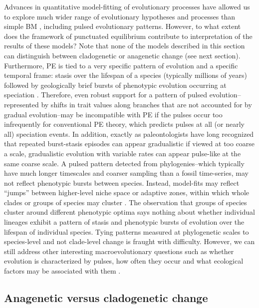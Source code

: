 Advances in quantitative model-fitting of evolutionary processes have allowed us to explore much wider range of evolutionary hypotheses and processes than simple BM \citep{PennellHarmon}, including pulsed evolutionary patterns. However, to what extent does the framework of punctuated equilibrium contribute to interpretation of the results of these models? Note that none of the models described in this section can distinguish between cladogenetic or anagenetic change (see next section). Furthermore, PE is tied to a very specific pattern of evolution and a specific temporal frame: stasis over the lifespan of a species (typically millions of years) followed by geologically brief bursts of phenotypic evolution occurring at speciation \citep{EldredgeGould1972, GouldEldredge1977, Gould2002}.  Therefore, even robust support for a pattern of pulsed evolution--represented by shifts in trait values along branches that are not accounted for by gradual evolution--may be incompatible with PE if the pulses occur too infrequently for conventional PE theory, which predicts pulses at all (or nearly all) speciation events. In addition, exactly as paleontologists have long recognized that repeated burst-stasis episodes can appear gradualistic if viewed at too coarse a scale, gradualistic evolution with variable rates can appear pulse-like at the same coarse scale. A pulsed pattern detected from phylogenies--which typically have much longer timescales and coarser sampling than a fossil time-series, may not reflect phenotypic bursts between species. Instead, model-fits may reflect ``jumps'' between higher-level niche space or adaptive zones, within which whole clades or groups of species may cluster \citep{Simpson1944, Hansen1997, Hansen2012book, Eastmanjump}. The observation that groups of species cluster around different phenotypic optima says nothing about whether individual lineages exhibit a pattern of stasis and phenotypic bursts of evolution over the lifespan of individual species. Tying patterns measured at phylogenetic scales to species-level and not clade-level change is fraught with difficulty. However, we can still address other interesting macroevolutionary questions such as whether evolution is characterized by pulses, how often they occur and what ecological factors may be associated with them \citep{Eastmanjump}.

\subsection{Anagenetic versus cladogenetic change}

